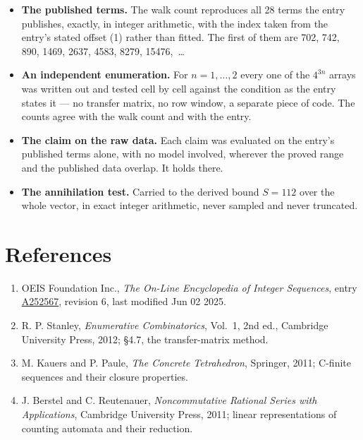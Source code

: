 \documentclass[11pt]{article}
\theoremstyle{definition}
\begin{document}
\begin{itemize}

\item {\bfseries The published terms.} The walk count reproduces all 28 terms the entry publishes, exactly, in integer arithmetic, with the index taken from the entry's stated offset (1) rather than fitted. The first of them are 702, 742, 890, 1469, 2637, 4583, 8279, 15476,~\dots

\item {\bfseries An independent enumeration.} For $n = 1,\dots,2$ every one of the $4^{3n}$ arrays was written out and tested cell by cell against the condition as the entry states it --- no transfer matrix, no row window, a separate piece of code. The counts agree with the walk count and with the entry.

\item {\bfseries The claim on the raw data.} Each claim was evaluated on the entry's published terms alone, with no model involved, wherever the proved range and the published data overlap. It holds there.

\item {\bfseries The annihilation test.} Carried to the derived bound $S = 112$ over the whole vector, in exact integer arithmetic, never sampled and never truncated.

\end{itemize}

\section{References}

\begin{enumerate}

\item OEIS Foundation Inc., \emph{The On-Line Encyclopedia of Integer Sequences}, entry \href{https://oeis.org/A252567}{A252567}, revision 6, last modified Jun 02 2025.

\item R. P. Stanley, \emph{Enumerative Combinatorics}, Vol.~1, 2nd ed., Cambridge University Press, 2012; \S4.7, the transfer-matrix method.

\item M. Kauers and P. Paule, \emph{The Concrete Tetrahedron}, Springer, 2011; C-finite sequences and their closure properties.

\item J. Berstel and C. Reutenauer, \emph{Noncommutative Rational Series with Applications}, Cambridge University Press, 2011; linear representations of counting automata and their reduction.

\end{enumerate}
\end{document}
